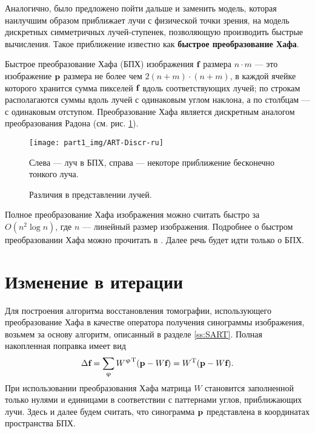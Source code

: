 Аналогично, было предложено пойти дальше и заменить модель, которая наилучшим образом приближает лучи с физической точки зрения, на модель дискретных симметричных лучей-ступенек, позволяющую производить быстрые вычисления.
Такое приближение известно как \textbf{быстрое преобразование Хафа}.

Быстрое преобразование Хафа (БПХ) изображения $\textbf f$ размера $n \cdot  m$ --- это изображение $\textbf p$ размера не более чем $2(n+m) \cdot (n+m)$, в каждой ячейке которого хранится сумма пикселей $\textbf f$ вдоль соответствующих лучей; по строкам располагаются суммы вдоль лучей с одинаковым углом наклона, а по столбцам --- с одинаковым отступом.
Преобразование Хафа является дискретным аналогом преобразования Радона (см. рис. \ref{fig:hough_radon}).

\begin{figure}[h!]
  \centering
    \texttt{[image: part1\_img/ART-Discr-ru]}
 \caption{Различия в представлении лучей.}
Слева --- луч в БПХ, справа --- некоторе приближение бесконечно тонкого луча.
\label{fig:hough_radon}
\end{figure}

Полное преобразование Хафа изображения можно считать быстро за $O(n^2\log n)$, где $n$ --- линейный размер изображения.
Подробнее о быстром преобразовании Хафа можно прочитать в \cite{hough}.
Далее речь будет идти только о БПХ.

\section{Изменение в итерации}
Для построения алгоритма восстановления томографии, использующего преобразование Хафа в качестве оператора получения синограммы изображения, возьмем за основу алгоритм, описанный в разделе \ref{ss:SART}.
Полная накопленная поправка имеет вид
\begin{equation}
\label{eq:sum}
\Delta \textbf f = \sum_\varphi {{W^\varphi}^{\mathrm T}(\textbf p - W\textbf f) } = W^{\mathrm T}(\textbf p - W \textbf f).
\end{equation}
При использовании преобразования Хафа матрица $W$ становится заполненной только нулями и единицами в соответствии с паттернами углов, приближающих лучи.
Здесь и далее будем считать, что синограмма $\textbf p$ представлена в координатах пространства БПХ.

